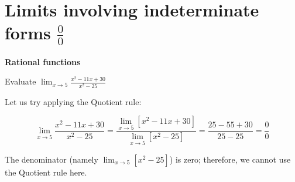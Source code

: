 \documentclass[
]{book}
\theoremstyle{definition}
\theoremstyle{definition}
\theoremstyle{definition}
\theoremstyle{definition}
\theoremstyle{remark}
\begin{document}
\section{\texorpdfstring{Limits involving indeterminate forms \(\frac{0}{0}\)}{Limits involving indeterminate forms \textbackslash frac\{0\}\{0\}}}\label{limits-involving-indeterminate-forms-frac00}

\textbf{Rational functions}

Evaluate \(\lim_{{x \to 5}} \frac{x^2 - 11x + 30}{x^2 - 25}\)

Let us try applying the Quotient rule:

\[\lim_{{x \to 5}} \frac{x^2 - 11x + 30}{x^2 - 25} = \frac{\lim_{{x \to 5}} [x^2 - 11x + 30]}{\lim_{{x \to 5}} [x^2 - 25]} = \frac{25 - 55 + 30}{25 - 25} = \frac{0}{0}\]

The denominator (namely \(\lim_{{x \to 5}} [x^2 - 25]\)) is zero;
therefore, we cannot use the Quotient rule here.
\end{document}
